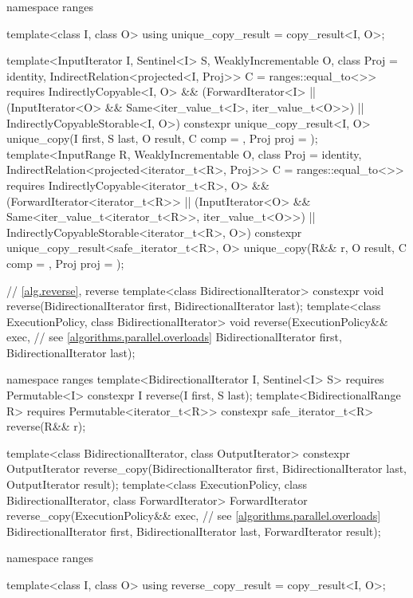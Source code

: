 \begin{codeblock}
{  namespace ranges {
    template<class I, class O>
    using unique_copy_result = copy_result<I, O>;

    template<InputIterator I, Sentinel<I> S, WeaklyIncrementable O,
        class Proj = identity, IndirectRelation<projected<I, Proj>> C = ranges::equal_to<>>
      requires IndirectlyCopyable<I, O> &&
        (ForwardIterator<I> ||
        (InputIterator<O> && Same<iter_value_t<I>, iter_value_t<O>>) ||
        IndirectlyCopyableStorable<I, O>)
      constexpr unique_copy_result<I, O>
        unique_copy(I first, S last, O result, C comp = {}, Proj proj = {});
    template<InputRange R, WeaklyIncrementable O, class Proj = identity,
        IndirectRelation<projected<iterator_t<R>, Proj>> C = ranges::equal_to<>>
      requires IndirectlyCopyable<iterator_t<R>, O> &&
        (ForwardIterator<iterator_t<R>> ||
        (InputIterator<O> && Same<iter_value_t<iterator_t<R>>, iter_value_t<O>>) ||
        IndirectlyCopyableStorable<iterator_t<R>, O>)
      constexpr unique_copy_result<safe_iterator_t<R>, O>
        unique_copy(R&& r, O result, C comp = {}, Proj proj = {});
  }

  // \ref{alg.reverse}, reverse
  template<class BidirectionalIterator>
    constexpr void reverse(BidirectionalIterator first, BidirectionalIterator last);
  template<class ExecutionPolicy, class BidirectionalIterator>
    void reverse(ExecutionPolicy&& exec, // see \ref{algorithms.parallel.overloads}
                 BidirectionalIterator first, BidirectionalIterator last);

  namespace ranges {
    template<BidirectionalIterator I, Sentinel<I> S>
      requires Permutable<I>
      constexpr I reverse(I first, S last);
    template<BidirectionalRange R>
      requires Permutable<iterator_t<R>>
      constexpr safe_iterator_t<R> reverse(R&& r);
  }

  template<class BidirectionalIterator, class OutputIterator>
    constexpr OutputIterator
      reverse_copy(BidirectionalIterator first, BidirectionalIterator last,
                   OutputIterator result);
  template<class ExecutionPolicy, class BidirectionalIterator, class ForwardIterator>
    ForwardIterator
      reverse_copy(ExecutionPolicy&& exec, // see \ref{algorithms.parallel.overloads}
                   BidirectionalIterator first, BidirectionalIterator last,
                   ForwardIterator result);

  namespace ranges {
    template<class I, class O>
    using reverse_copy_result = copy_result<I, O>;

}}
\end{codeblock}
